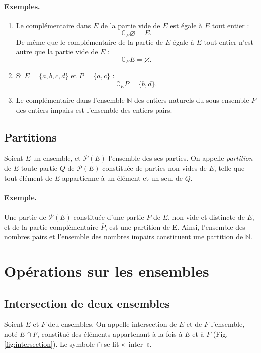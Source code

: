 \documentclass[12pt,parskip=full,chapterprefix=true,a5paper]{scrbook}
\begin{document}
\paragraph{Exemples.}
\begin{enumerate}
\item Le complémentaire dans \(E\) de la partie vide de \(E\) est égale à \(E\) tout entier :
    \[
      \complement_E\varnothing=E.
    \]
    De même que le complémentaire de la partie de \(E\) égale à \(E\) tout entier n'est autre que la partie vide de \(E\) :
    \[
      \complement_EE=\varnothing.
    \]
\item Si \(E=\{a,b,c,d\}\) et \(P=\{a,c\}\) :
    \[
      \complement_EP=\{b,d\}.
    \]
\item Le complémentaire dans l'ensemble \(\mathbb{N}\) des entiers naturels du sous-ensemble \(P\) des entiers impairs est l'ensemble des entiers pairs.
\end{enumerate}

\subsection*{Partitions}
Soient \(E\) un ensemble, et \(\mathcal{P}(E)\) l'ensemble des ses parties. On appelle \emph{partition} de \(E\) toute partie \(Q\) de \(\mathcal{P}(E)\) constituée de parties non vides de \(E\), telle que tout élément de \(E\) appartienne à un élément et un seul de \(Q\).

\paragraph{Exemple.}
Une partie de \(\mathcal{P}(E)\) constituée d'une partie \(P\) de \(E\), non vide et distincte de \(E\), et de la partie complémentaire \(\overline{P}\), est une partition de E. Ainsi, l'ensemble des nombres pairs et l'ensemble des nombres impairs constituent une partition de \(\mathbb{N}\).

\section{Opérations sur les ensembles}

\subsection*{Intersection de deux ensembles}
Soient \(E\) et \(F\) deu ensembles. On appelle intersection de \(E\) et de \(F\) l'ensemble, noté \(E\cap F\), constitué des éléments appartenant à la fois à \(E\) et à \(F\) (Fig. \ref{fig:intersection}). Le symbole \(\cap\) se lit «~inter~».
\end{document}
